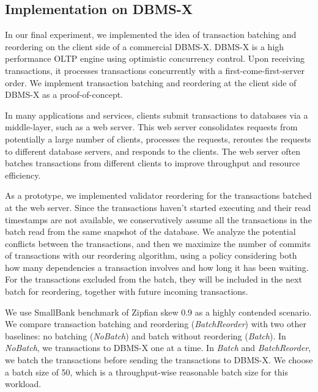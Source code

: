 \subsection{Implementation on DBMS-X}
\label{subsec:experiment:compare}

In our final experiment, we implemented the idea of transaction batching and reordering on the client side of a commercial DBMS-X. DBMS-X is a high performance OLTP engine using optimistic concurrency control. Upon receiving transactions, it processes transactions concurrently with a first-come-first-server order. We implement transaction batching and reordering at the client side of DBMS-X as a proof-of-concept.

In many applications and services, clients submit transactions to databases via a middle-layer, such as a web server. This web server consolidates requests from potentially a large number of clients, processes the requests, reroutes the requests to different database servers, and responds to the clients. The web server often batches transactions from different clients to improve throughput and resource efficiency. 

As a prototype, we implemented validator reordering for the transactions batched at the web server. Since the transactions haven't started executing and their read timestamps are not available, we conservatively assume all the transactions in the batch read from the same snapshot of the database. We analyze the potential conflicts between the transactions, and then we maximize the number of commits of transactions with our reordering algorithm, using a policy considering both how many dependencies a transaction involves and how long it has been waiting. For the transactions excluded from the batch, they will be included in the next batch for reordering, together with future incoming transactions.

We use SmallBank benchmark of Zipfian skew 0.9 as a highly contended scenario. We compare transaction batching and reordering (\emph{BatchReorder}) with two other baselines: no batching (\emph{NoBatch}) and batch without reordering (\emph{Batch}). In \emph{NoBatch}, we transactions to DBMS-X one at a time. In \emph{Batch} and \emph{BatchReorder}, we batch the transactions before sending the transactions to DBMS-X. We choose a batch size of 50, which is a throughput-wise reasonable batch size for this workload.


